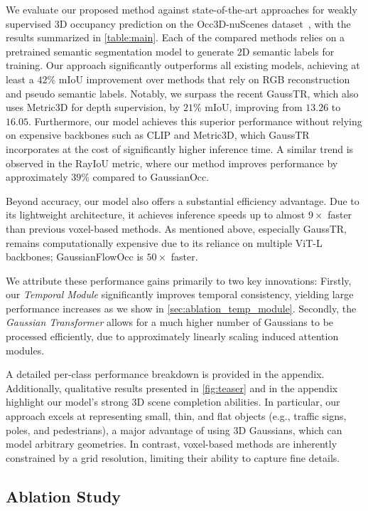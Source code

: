 \documentclass[10pt,twocolumn,letterpaper]{article}
\begin{document}
We evaluate our proposed method against state-of-the-art approaches for weakly supervised 3D occupancy prediction on the Occ3D-nuScenes dataset~\cite{tian2023occ3d}, with the results summarized in \cref{table:main}.
Each of the compared methods relies on a pretrained semantic segmentation model to generate 2D semantic labels for training.
Our approach significantly outperforms all existing models, achieving at least a $42\%$ mIoU improvement over methods that rely on RGB reconstruction and pseudo semantic labels.
Notably, we surpass the recent GaussTR, which also uses Metric3D for depth supervision, by $21\%$ mIoU, improving from $13.26$ to $16.05$.
Furthermore, our model achieves this superior performance without relying on expensive backbones such as CLIP and Metric3D, which GaussTR incorporates at the cost of significantly higher inference time.
A similar trend is observed in the RayIoU metric, where our method improves performance by approximately $39\%$ compared to GaussianOcc.

Beyond accuracy, our model also offers a substantial efficiency advantage.
Due to its lightweight architecture, it achieves inference speeds up to almost $9\times$ faster than previous voxel-based methods.
As mentioned above, especially GaussTR, remains computationally expensive due to its reliance on multiple ViT-L backbones; GaussianFlowOcc is $50 \times$ faster.

We attribute these performance gains primarily to two key innovations: 
Firstly, our \emph{Temporal Module} significantly improves temporal consistency, yielding large performance increases as we show in \cref{sec:ablation_temp_module}. 
Secondly, the \emph{Gaussian Transformer} allows for a much higher number of Gaussians to be processed efficiently, due to approximately linearly scaling induced attention modules.

A detailed per-class performance breakdown is provided in the appendix.
Additionally, qualitative results presented in \cref{fig:teaser} and in the appendix highlight our model’s strong 3D scene completion abilities.
In particular, our approach excels at representing small, thin, and flat objects (e.g., traffic signs, poles, and pedestrians), a major advantage of using 3D Gaussians, which can model arbitrary geometries.
In contrast, voxel-based methods are inherently constrained by a grid resolution, limiting their ability to capture fine details.

\subsection{Ablation Study} \label{sec:exp3}
\end{document}
